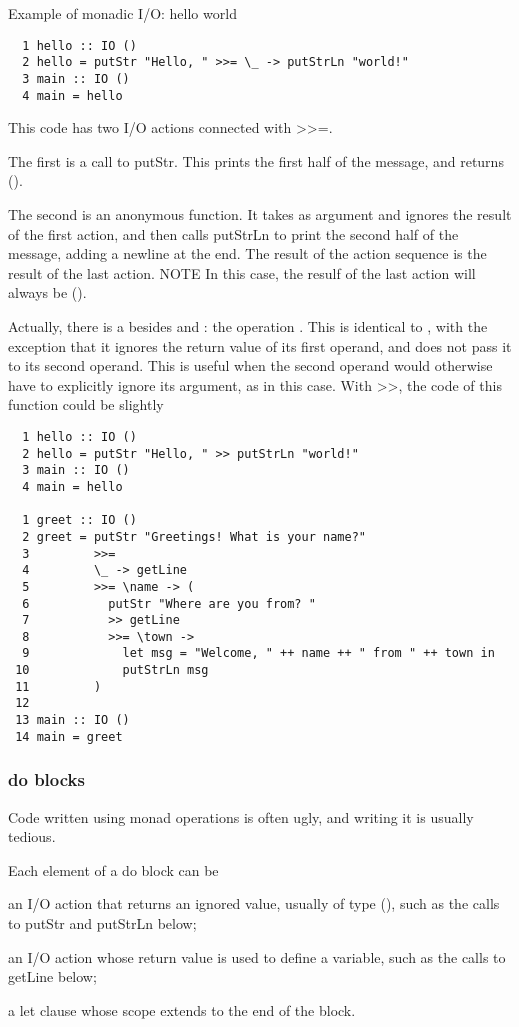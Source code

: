 Example of monadic I/O: hello world
\begin{lstlisting}
  1 hello :: IO ()
  2 hello = putStr "Hello, " >>= \_ -> putStrLn "world!"
  3 main :: IO ()
  4 main = hello
\end{lstlisting}
\begin{compactitem}
This code has two I/O actions connected with >>=.
\item The first is a call to putStr. This prints the
first half of the message, and returns ().
\item The second is an anonymous function. It takes
as argument and ignores the result of the first
action, and then calls putStrLn to print the
second half of the message, adding a newline
at the end.
The result of the action sequence is the result of the
last action.
NOTE In this case, the resulf of the last action will
always be ().

Actually, there is a  besides
 and \e{>>=}: the operation \e{>>}. This is identical
to \e{>>=}, with the exception that it ignores the return
value of its first operand, and does not pass it to
its second operand. This is useful when the second
operand would otherwise have to explicitly ignore
its argument, as in this case.
With >>, the code of this function could be slightly
\begin{lstlisting}
  1 hello :: IO ()
  2 hello = putStr "Hello, " >> putStrLn "world!"
  3 main :: IO ()
  4 main = hello
  
  1 greet :: IO ()
  2 greet = putStr "Greetings! What is your name?"
  3         >>=
  4         \_ -> getLine
  5         >>= \name -> (
  6           putStr "Where are you from? "
  7           >> getLine
  8           >>= \town ->
  9             let msg = "Welcome, " ++ name ++ " from " ++ town in
 10             putStrLn msg
 11         )
 12
 13 main :: IO ()
 14 main = greet
\end{lstlisting}
\end{compactitem}

\subsubsection{do blocks}
Code written using monad operations is often ugly,
and writing it is usually tedious. 

Each element of a do block can be
\begin{compactitem} 
\item an I/O action that returns an ignored value,
usually of type (), such as the calls to putStr
and putStrLn below;
\item an I/O action whose return value is used to
define a variable, such as the calls to getLine
below;
\item a let clause whose scope extends to the end of
the block.
\end{compactitem}

